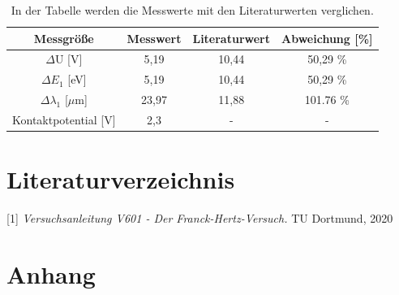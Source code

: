 \documentclass[titlepage = firstcover]{scrartcl}
\begin{document}
        \FloatBarrier
            
        \begin{table}[h]
          \centering
          \caption{In der Tabelle werden die Messwerte mit den Literaturwerten verglichen.}
        
          \begin{tabular}{c c c c}
              \toprule
              {Messgröße} & {Messwert} & {Literaturwert} & {Abweichung [\%]}\\
              \midrule
        
              $\Delta$U [V]                & 5,19    & 10,44  & 50,29 \%    \\
              $\Delta E_1$ [eV]             & 5,19  & 10,44 & 50,29 \%       \\
              $\Delta \lambda_1 $ [$\mu$m]   & 23,97     & 11,88  & 101.76 \%    \\
              Kontaktpotential [V]         & 2,3  & - &  -                  \\
              \bottomrule
          \end{tabular}
        \end{table}
  
        \FloatBarrier



    \section{Literaturverzeichnis}
        [1] \textit{Versuchsanleitung V601 - Der Franck-Hertz-Versuch.} TU Dortmund, 2020 \newline


    \section{Anhang}
\end{document}
